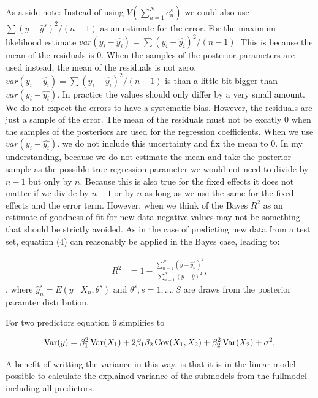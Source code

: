 \documentclass[11pt,a4paper,twoside]{book}\usepackage[]{graphicx}\usepackage[]{color}
\begin{document}
As a side note: Instead of using $V(\sum_{n=1}^{N}e^s_{n})$ we could also use $ \sum(y - \hat{y}^s)^2/(n-1) $ as an estimate for the error. For the maximum likelihood estimate $var(y_{i} - \hat{y_{i}}) = \sum (y_{i} - \hat{y_{i}})^2/ (n-1) $. This is because the mean of the residuals is 0. When the  samples of the posterior parameters are used instead, the mean of the residuals is not zero. $var(y_{i} - \hat{y_{i}}) = \sum (y_{i} - \hat{y_{i}})^2/ (n-1) $ is than a little bit bigger than $var(y_{i} - \hat{y_{i}}). $ In practice the values should only differ by a very small amount. We do not expect the errors to have a systematic bias. However, the residuals are just a sample of the error. The mean of the residuals must not be excatly 0 when the samples of the posteriors are used for the regression coefficients. When we use $var(y_{i} - \hat{y_{i}}). $ we do not include this uncertainty and fix the mean to 0. In my understanding, because we do not estimate the mean and take the posterior sample as the possible true regression parameter we would not need to divide by $n-1$ but only by $n$. Because this is also true for the fixed effects it does not matter if we divide by $n-1$ or by $n$ as long as we use the same for the fixed effects and the error term.  However, when we think of the Bayes $R^2$ as an estimate of goodness-of-fit for new data negative values may not be something that should be strictly avoided. As in the case of predicting new data from a test set, equation (4) can reasonably be applied in the Bayes case, leading to:

      \begin{align} 
        R^2 &= 1 - \frac{\sum_{n=1}^{N}(y - \hat{y}^s_{n})^2}{\sum_{n=1}^{N}(y-\bar{y})^2}   \label{eq:7},
    \end{align} 
, where $\hat{y}^s_{n}  = E \left({y \mid X_{n}, \theta^s}\right) $ and $\theta^s, s = 1, ... , S$ are draws from the posterior paramter distribution.

For two predictors equation 6 simplifies to

      \begin{align} 
        \operatorname{Var}(y) = \beta_{1}^2 \operatorname{Var}(X_{1}) + 2  \beta_{1}  \beta_{2} \operatorname{Cov}(X_{1}, X_{2}) + \beta_{2}^2 \operatorname{Var}(X_{2}) + \sigma^2, \label{eq:8} 
   \end{align}

 A benefit of writting the variance in this way, is that it is in the linear model possible to calculate the explained variance of the submodels from the fullmodel including all predictors.
 
\end{document}
